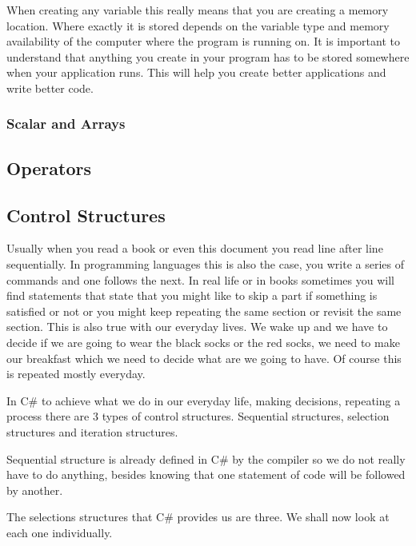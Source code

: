 \documentclass[
]{book}
\begin{document}
When creating any variable this really means that you are creating a memory location. Where exactly it is stored depends on the variable type and memory availability of the computer where the program is running on. It is important to understand that anything you create in your program has to be stored somewhere when your application runs. This will help you create better applications and write better code.

\hypertarget{scalar-and-arrays}{%
\subsubsection*{Scalar and Arrays}\label{scalar-and-arrays}}

\hypertarget{operators}{%
\subsection{Operators}\label{operators}}

\hypertarget{control-structures}{%
\subsection{Control Structures}\label{control-structures}}

Usually when you read a book or even this document you read line after line sequentially. In programming languages this is also the case, you write a series of commands and one follows the next. In real life or in books sometimes you will find statements that state that you might like to skip a part if something is satisfied or not or you might keep repeating the same section or revisit the same section. This is also true with our everyday lives. We wake up and we have to decide if we are going to wear the black socks or the red socks, we need to make our breakfast which we need to decide what are we going to have. Of course this is repeated mostly everyday.

In C\# to achieve what we do in our everyday life, making decisions, repeating a process there are 3 types of control structures. Sequential structures, selection structures and iteration structures.

Sequential structure is already defined in C\# by the compiler so we do not really have to do anything, besides knowing that one statement of code will be followed by another.

The selections structures that C\# provides us are three. We shall now look at each one individually.
\end{document}
